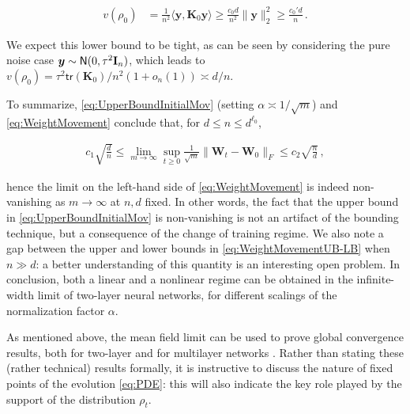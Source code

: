  \begin{align}
    v(\rho_0) &= \frac{1}{n^2}\langle{\boldsymbol y},{\boldsymbol K}_0{\boldsymbol y}\rangle \ge  \frac{c_0d}{n^2} \|{\boldsymbol y}\|_2^2 \ge  \frac{c_0'd}{n}\, .
  \end{align}

  We expect this lower bound to be tight, as can be seen by considering the pure noise case
  ${\boldsymbol y}\sim{\sf N}(0,\tau^2{\mathbf I}_n)$, which leads to   $v(\rho_0) = \tau^2{\mathsf{tr}}({\boldsymbol K}_0)/n^2(1+o_n(1))\asymp d/n$.

  To summarize, \eqref{eq:UpperBoundInitialMov} (setting $\alpha \asymp 1/\sqrt{m}$)
  and \eqref{eq:WeightMovement} conclude that, for $d\le n\le d^{\ell_0}$,

  \begin{align}
    c_1\sqrt{\frac{d}{n}} \le  \lim_{m\to\infty} \sup_{t\ge 0}\frac{1}{\sqrt{m}}\|{\boldsymbol W}_t-{\boldsymbol W}_0\|_F \le c_2\sqrt{\frac{n}{d}}\, ,
    \label{eq:WeightMovementUB-LB}
\end{align}

hence the limit on the left-hand side of \eqref{eq:WeightMovement} is indeed non-vanishing as $m\to\infty$ at $n,d$ fixed. In other words, the fact that the upper bound in \eqref{eq:UpperBoundInitialMov} is non-vanishing is not an artifact of the bounding technique, but a consequence of the change of training regime. We also note a gap between the upper and lower bounds in
\eqref{eq:WeightMovementUB-LB} when $n\gg d$: a better understanding of this quantity is an interesting open problem. In conclusion, both a linear and a nonlinear regime can be obtained in the infinite-width limit of two-layer neural networks, for different scalings of the normalization factor $\alpha$. 

  As mentioned above, the mean field limit can be used to prove global convergence results, both for two-layer \cite{mei2018mean,chizat2018global} and for multilayer  networks \cite{nguyen2020rigorous}. Rather than stating these (rather technical) results formally, it is instructive to discuss the nature of fixed points of the evolution \eqref{eq:PDE}: this will also indicate the key role played by the support of the distribution $\rho_t$.

